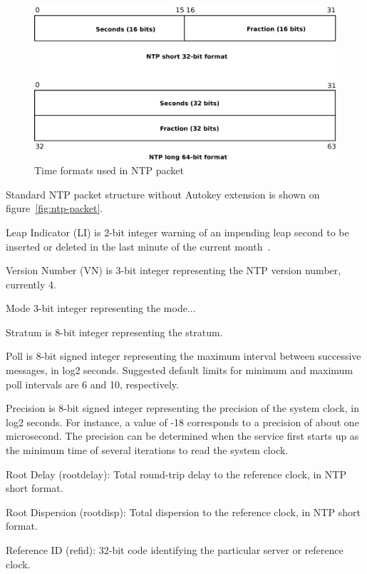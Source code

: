 \begin{figure}
	\centering
	\includegraphics[width=13cm,keepaspectratio]{fig/ntp-timestamps.pdf}
	\caption{Time formats used in NTP packet}
	\label{fig:ntp-timestamps}
	\bigskip
\end{figure}

Standard NTP packet structure without Autokey extension is shown on figure~\ref{fig:ntp-packet}.

Leap Indicator (LI) is 2-bit integer warning of an impending leap
second to be inserted or deleted in the last minute of the current
month~\cite{rfc5905}.

Version Number (VN) is 3-bit integer representing the NTP
version number, currently 4.

Mode 3-bit integer representing the mode...

Stratum is 8-bit integer representing the stratum.

Poll is 8-bit signed integer representing the maximum interval between
successive messages, in log2 seconds.
Suggested default limits for minimum and maximum poll intervals are 6 and 10, respectively.

Precision is 8-bit signed integer representing the precision of the
system clock, in log2 seconds.
For instance, a value of -18
corresponds to a precision of about one microsecond. %
The precision
can be determined when the service first starts up as the minimum
time of several iterations to read the system clock.
   
   
   
   Root Delay (rootdelay): Total round-trip delay to the reference
   clock, in NTP short format.

   Root Dispersion (rootdisp): Total dispersion to the reference clock,
   in NTP short format.

Reference ID (refid): 32-bit code identifying the particular server or reference clock.

